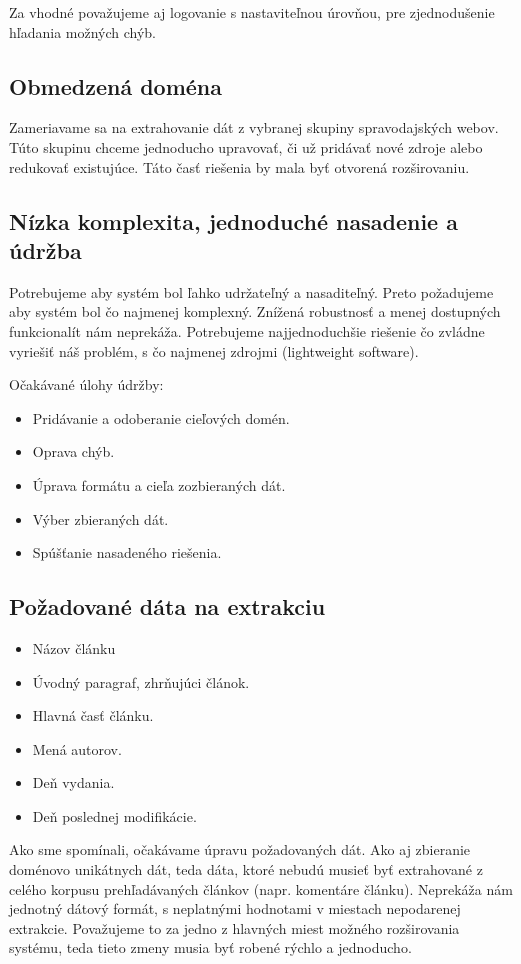 Za vhodné považujeme aj logovanie s nastaviteľnou úrovňou, pre zjednodušenie hľadania možných chýb.

\subsection{Obmedzená doména} \label{c:reqDomain}
Zameriavame sa na extrahovanie dát z vybranej skupiny spravodajských webov. Túto skupinu chceme jednoducho upravovať, či už pridávať nové zdroje alebo redukovať existujúce. Táto časť riešenia by mala byť otvorená rozširovaniu. 

\subsection{Nízka komplexita, jednoduché nasadenie a údržba} \label{c:reqKomplexity}
Potrebujeme aby systém bol ľahko udržateľný a nasaditeľný. Preto požadujeme aby systém bol čo najmenej komplexný. Znížená robustnosť a menej dostupných funkcionalít nám neprekáža. Potrebujeme najjednoduchšie riešenie čo zvládne vyriešiť náš problém, s čo najmenej zdrojmi (lightweight software). 

Očakávané úlohy údržby: 
\begin{itemize}
  \item Pridávanie a odoberanie cieľových domén.
  \item Oprava chýb.
  \item Úprava formátu a cieľa zozbieraných dát.
  \item Výber zbieraných dát.
  \item Spúšťanie nasadeného riešenia. 
\end{itemize}


\subsection{Požadované dáta na extrakciu} \label{c:reqData}
\begin{itemize}
  \item Názov článku
  \item Úvodný paragraf, zhrňujúci článok.
  \item Hlavná časť článku.
  \item Mená autorov.
  \item Deň vydania. 
  \item Deň poslednej modifikácie.
\end{itemize}

Ako sme spomínali, očakávame úpravu požadovaných dát. Ako aj zbieranie doménovo unikátnych dát, teda dáta, ktoré nebudú musieť byť extrahované z celého korpusu prehľadávaných článkov (napr. komentáre článku). Neprekáža nám jednotný dátový formát, s neplatnými hodnotami v miestach nepodarenej extrakcie. 
Považujeme to za jedno z hlavných miest možného rozširovania systému, teda tieto zmeny musia byť robené rýchlo a jednoducho. 

